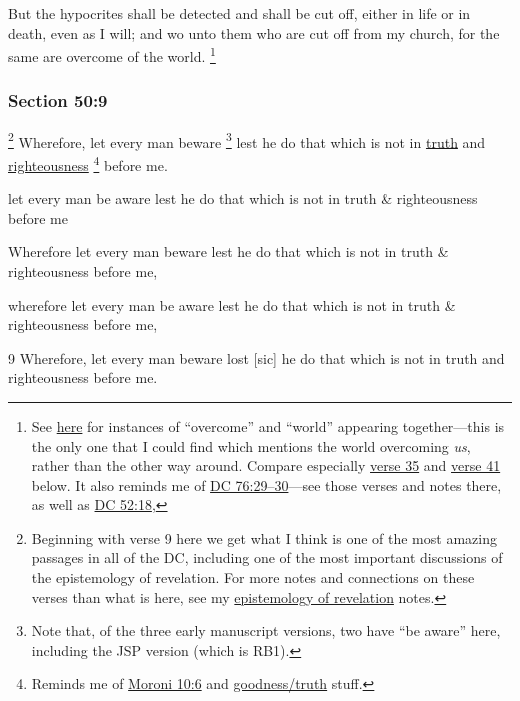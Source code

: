		But the hypocrites shall be detected and shall be cut off, either in life or in death, even as I will; and wo unto them who are cut off from my church, for the same are overcome of the world.%
			\footnote{%
				See \hyperref[WORLD-PHRASES]{here} for instances of ``overcome'' and ``world'' appearing together---this is the only one that I could find which mentions the world overcoming \textit{us}, rather than the other way around. Compare especially \hyperref[DC50-35]{verse 35} and \hyperref[DC50-41]{verse 41} below. It also reminds me of \hyperref[DC76-29]{DC 76:29--30}---see those verses and notes there, as well as \hyperref[DC52-18]{DC 52:18}, 
				}


	\subsubsection{Section 50:9} %
		\label{DC50-9}

			\footnote{%
				Beginning with verse 9 here we get what I think is one of the most amazing passages in all of the DC, including one of the most important discussions of the epistemology of revelation. For more notes and connections on these verses than what is here, see my \hyperref[EPIST-REVELATION-DC]{epistemology of revelation} notes.
				}%
		Wherefore, let every man beware%
			\footnote{%
				Note that, of the three early manuscript versions, two have ``be aware'' here, including the JSP version (which is RB1).
				}
		lest he do that which is not in \hyperref[TRUTH]{truth} and \hyperref[RIGHTEOUSNESS]{righteousness}%
			\footnote{%
				Reminds me of \hyperref[MORONI-10-6]{Moroni 10:6} and \hyperref[GOODNESS-truth]{goodness/truth} stuff.
				}
		before me.

		\begin{framed}
		\scriptsize
			\begin{compactdesc}
				\item[JSP] let every man be aware lest he do that which is not in truth \& righteousness before me
				\item[Gilbert] Wherefore let every man beware lest he do that which is not in truth \& righteousness before me,
				\item[Hyde and Smith] wherefore let every man be aware lest he do that which is not in truth \& righteousness before me,
				\item[BC] 9 Wherefore, let every man beware lost [sic] he do that which is not in truth and righteousness before me.
			\end{compactdesc}
		\end{framed}

